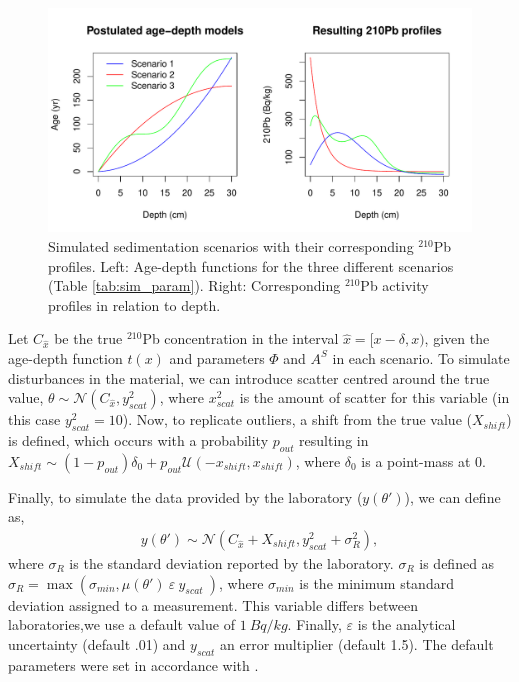 \documentclass [10pt] {article}
\begin{document}
\begin{figure}[!h]
 \centering
  \includegraphics[width=.95\linewidth]{chronology.pdf}
	\caption{Simulated sedimentation scenarios with their corresponding $^{210}$Pb profiles. Left: Age-depth functions for the three different scenarios (Table \ref{tab:sim_param}). Right: Corresponding $^{210}$Pb activity profiles in relation to depth.}
  \label{fig:true_210}
\end{figure}


	Let $C_{\hat{x}}$ be the true $^{210}$Pb concentration in the interval $\hat{x}=[ x-\delta, x)$, given the age-depth function $t(x)$ and parameters $\Phi$ and $A^S$ in each scenario. 
To simulate disturbances in the material, we can introduce scatter centred around the true value, $\theta \sim \mathcal{N}\left(C_{\hat{x}},y^2_{scat}\right)$, where $x^2_{scat}$ is the amount of scatter for this variable (in this case $y^2_{scat}=10$). 
Now, to replicate outliers, a shift from the true value ($X_{shift}$) is defined, which occurs with a probability $p_{out}$ resulting in 
$X_{shift} \sim (1-p_{out}) \delta_0 + p_{out} \mathcal{U}(-x_{shift}, x_{shift})$, where $\delta_0$ is a point-mass at 0.

Finally, to simulate the data provided by the laboratory ($y(\theta')$), we can define as,  
\begin{align}
	y(\theta')\sim\mathcal{N}\left(C_{\hat{x}} + X_{shift}, y^2_{scat} + \sigma^2_{R} \right), 
\end{align}
where $\sigma_R$ is the standard deviation reported by the laboratory. 
$\sigma_R$ is defined as $\sigma_R= \max \left(\sigma_{min}, \mu(\theta')~\varepsilon~y_{scat}~\right)$, where $\sigma_{min}$ is the minimum standard deviation assigned to a measurement. This variable differs between laboratories,we use a default value of $1~ Bq/kg$. 
Finally, $\varepsilon$ is the analytical uncertainty (default .01) and $y_{scat}$ an error multiplier (default 1.5).
The default parameters were set in accordance with \citet{Blaauw2018}.
\end{document}
